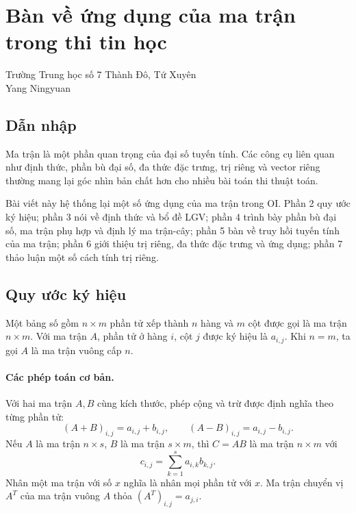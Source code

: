 \documentclass[11pt]{article}
\begin{document}
\section{Bàn về ứng dụng của ma trận trong thi tin học}

\begin{center}
Trường Trung học số 7 Thành Đô, Tứ Xuyên\\
Yang Ningyuan
\end{center}

\renewcommand{\abstractname}{Tóm tắt}
\begin{abstract}
Ma trận có ứng dụng rất rộng trong tin học. Bài viết xuất phát từ khái niệm và
tính chất cơ bản của ma trận, đưa ra các thuật toán tốt cho những công cụ như
bổ đề LGV và đa thức đặc trưng, đồng thời thảo luận một số bài thi liên quan.
Bài viết cũng giới thiệu phần bù đại số, cách tính hiệu quả của nó và ứng dụng
trong định lý ma trận-cây. Cuối cùng, tác giả trình bày một số phương pháp tính
nghiệm số của trị riêng như thuật toán Jacobi và lặp QR.
\end{abstract}

\subsection{Dẫn nhập}

Ma trận là một phần quan trọng của đại số tuyến tính. Các công cụ liên quan như
định thức, phần bù đại số, đa thức đặc trưng, trị riêng và vector riêng thường
mang lại góc nhìn bản chất hơn cho nhiều bài toán thi thuật toán.

Bài viết này hệ thống lại một số ứng dụng của ma trận trong OI. Phần 2 quy ước
ký hiệu; phần 3 nói về định thức và bổ đề LGV; phần 4 trình bày phần bù đại
số, ma trận phụ hợp và định lý ma trận-cây; phần 5 bàn về truy hồi tuyến tính
của ma trận; phần 6 giới thiệu trị riêng, đa thức đặc trưng và ứng dụng; phần 7
thảo luận một số cách tính trị riêng.

\subsection{Quy ước ký hiệu}

Một bảng số gồm \(n\times m\) phần tử xếp thành \(n\) hàng và \(m\) cột được
gọi là ma trận \(n\times m\). Với ma trận \(A\), phần tử ở hàng \(i\), cột
\(j\) được ký hiệu là \(a_{i,j}\). Khi \(n=m\), ta gọi \(A\) là ma trận vuông
cấp \(n\).

\paragraph{Các phép toán cơ bản.}
Với hai ma trận \(A,B\) cùng kích thước, phép cộng và trừ được định nghĩa theo
từng phần tử:
\[
  (A+B)_{i,j}=a_{i,j}+b_{i,j},\qquad
  (A-B)_{i,j}=a_{i,j}-b_{i,j}.
\]
Nếu \(A\) là ma trận \(n\times s\), \(B\) là ma trận \(s\times m\), thì
\(C=AB\) là ma trận \(n\times m\) với
\[
  c_{i,j}=\sum_{k=1}^s a_{i,k}b_{k,j}.
\]
Nhân một ma trận với số \(x\) nghĩa là nhân mọi phần tử với \(x\). Ma trận
chuyển vị \(A^T\) của ma trận vuông \(A\) thỏa \((A^T)_{i,j}=a_{j,i}\).
\end{document}
